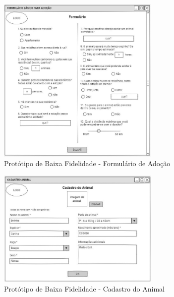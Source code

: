 \begin{figure}[htb]
    \centering
	\includegraphics[width=0.7\textwidth]{imagens/formulario_adocao.jpeg}
	\caption{\label{fig_formulario}Protótipo de Baixa Fidelidade - Formulário de Adoção}
\end{figure}

\begin{figure}[htb]
    \centering
	\includegraphics[width=0.7\textwidth]{imagens/cadastro_animal.jpeg}
	\caption{\label{fig_cad_animal}Protótipo de Baixa Fidelidade - Cadastro do Animal}
\end{figure}